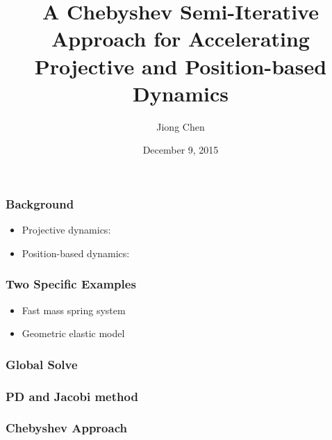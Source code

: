 \documentclass[serif,mathserif]{beamer}
\author[Jiong Chen]{Jiong Chen}
\title[\hspace{2em}\insertframenumber/\inserttotalframenumber]{\huge A Chebyshev Semi-Iterative Approach for Accelerating Projective and Position-based Dynamics}
\date{December 9, 2015} %
\begin{document}
\maketitle

\begin{frame}
 \frametitle{Background}
 \begin{itemize}
  \item Projective dynamics:
  \item Position-based dynamics:
 \end{itemize}
\end{frame}

\begin{frame}
 \frametitle{Two Specific Examples}
 \begin{itemize}
  \item Fast mass spring system
  \item Geometric elastic model
 \end{itemize}
\end{frame}

\begin{frame}
 \frametitle{Global Solve}
\end{frame}

\begin{frame}
 \frametitle{PD and Jacobi method}
\end{frame}

\begin{frame}
  \frametitle{Chebyshev Approach}
\end{frame}

\begin{frame} 
\end{frame}
\end{document}
